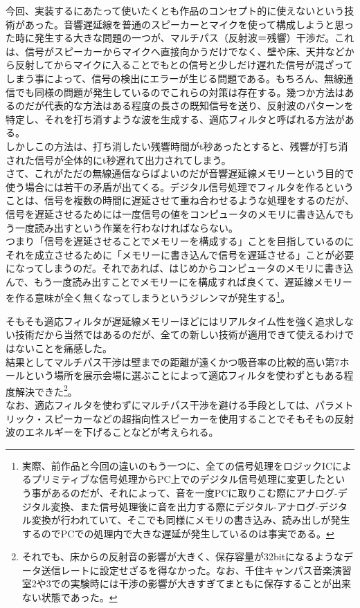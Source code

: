 \documentclass[a4paper,report]{jsbook}
\begin{document}
今回、実装するにあたって使いたくとも作品のコンセプト的に使えないという技術があった。音響遅延線を普通のスピーカーとマイクを使って構成しようと思った時に発生する大きな問題の一つが、マルチパス（反射波＝残響）干渉だ。これは、信号がスピーカーからマイクへ直接向かうだけでなく、壁や床、天井などから反射してからマイクに入ることでもとの信号と少しだけ遅れた信号が混ざってしまう事によって、信号の検出にエラーが生じる問題である。もちろん、無線通信でも同様の問題が発生しているのでこれらの対策は存在する。幾つか方法はあるのだが代表的な方法はある程度の長さの既知信号を送り、反射波のパターンを特定し、それを打ち消すような波を生成する、適応フィルタと呼ばれる方法がある。\\
しかしこの方法は、打ち消したい残響時間がt秒あったとすると、残響が打ち消された信号が全体的にt秒遅れて出力されてしまう。\\
さて、これがただの無線通信ならばよいのだが音響遅延線メモリーという目的で使う場合には若干の矛盾が出てくる。デジタル信号処理でフィルタを作るということは、信号を複数の時間に遅延させて重ね合わせるような処理をするのだが、信号を遅延させるためには一度信号の値をコンピュータのメモリに書き込んでもう一度読み出すという作業を行わなければならない。\\
つまり「信号を遅延させることでメモリーを構成する」ことを目指しているのにそれを成立させるために「メモリーに書き込んで信号を遅延させる」ことが必要になってしまうのだ。それであれば、はじめからコンピュータのメモリに書き込んで、もう一度読み出すことでメモリーにを構成すれば良くて、遅延線メモリーを作る意味が全く無くなってしまうというジレンマが発生する\footnote{実際、前作品と今回の違いのもう一つに、全ての信号処理をロジックICによるプリミティブな信号処理からPC上でのデジタル信号処理に変更したという事があるのだが、それによって、音を一度PCに取りこむ際にアナログ-デジタル変換、また信号処理後に音を出力する際にデジタル-アナログ-デジタル変換が行われていて、そこでも同様にメモリの書き込み、読み出しが発生するのでPCでの処理内で大きな遅延が発生しているのは事実である。}。

そもそも適応フィルタが遅延線メモリーほどにはリアルタイム性を強く追求しない技術だから当然ではあるのだが、全ての新しい技術が適用できて使えるわけではないことを痛感した。\\
結果としてマルチパス干渉は壁までの距離が遠くかつ吸音率の比較的高い第7ホールという場所を展示会場に選ぶことによって適応フィルタを使わずともある程度解決できた\footnote{それでも、床からの反射音の影響が大きく、保存容量が32bitになるようなデータ送信レートに設定せざるを得なかった。なお、千住キャンパス音楽演習室2や3での実験時には干渉の影響が大きすぎてまともに保存することが出来ない状態であった。}。\\
なお、適応フィルタを使わずにマルチパス干渉を避ける手段としては、パラメトリック・スピーカーなどの超指向性スピーカーを使用することでそもそもの反射波のエネルギーを下げることなどが考えられる。
\end{document}
